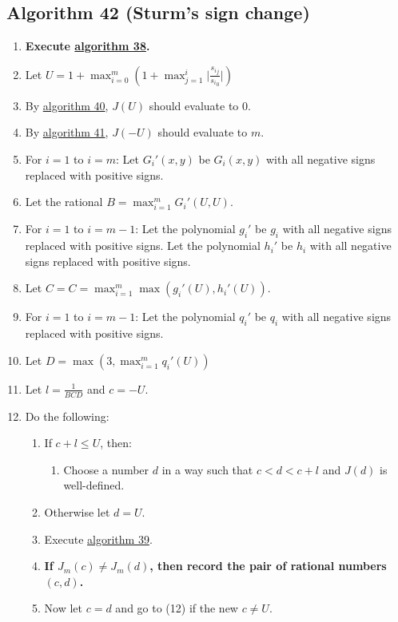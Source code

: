 \documentclass[twocolumn]{article}
\begin{document}
		\subsection{Algorithm 42 (Sturm's sign change)}\label{sec:algorithm 42}
			\begin{enumerate}
				\item \textbf{Execute \hyperref[sec:algorithm 38]{algorithm 38}.}
				\item Let $U=1+\max_{i=0}^m\left(1+\max_{j=1}^i\lvert\frac{{s_i}_j}{{s_i}_0}\rvert\right)$
				\item By \hyperref[sec:algorithm 40]{algorithm 40}, $J(U)$ should evaluate to $0$.
				\item By \hyperref[sec:algorithm 41]{algorithm 41}, $J(-U)$ should evaluate to $m$.
				\item For $i=1$ to $i=m$: Let $G_i'(x,y)$ be $G_i(x,y)$ with all negative signs replaced with positive signs.
				\item Let the rational $B=\max_{i=1}^m G_i'(U,U)$.
				\item For $i=1$ to $i=m-1$: Let the polynomial $g_i'$ be $g_i$ with all negative signs replaced with positive signs. Let the polynomial $h_i'$ be $h_i$ with all negative signs replaced with positive signs.
				\item Let $C=C=\max_{i=1}^m \max(g_i'(U),h_i'(U))$.
				\item For $i=1$ to $i=m-1$: Let the polynomial $q_i'$ be $q_i$ with all negative signs replaced with positive signs.
				\item Let $D=\max(3, \max_{i=1}^m q_i'(U))$
				\item Let $l=\frac{1}{BCD}$ and $c=-U$.
				\item Do the following:
				\begin{enumerate}
					\item If $c+l\le U$, then:
					\begin{enumerate}
						\item Choose a number $d$ in a way such that $c<d<c+l$ and $J(d)$ is well-defined.
					\end{enumerate}
					\item Otherwise let $d=U$.
					\item Execute \hyperref[sec:algorithm 39]{algorithm 39}.
					\item \textbf{If $J_m(c)\ne J_m(d)$, then record the pair of rational numbers $(c,d)$.}
					\item Now let $c=d$ and go to (12) if the new $c\ne U$.
				\end{enumerate}

\end{enumerate}
\end{document}

